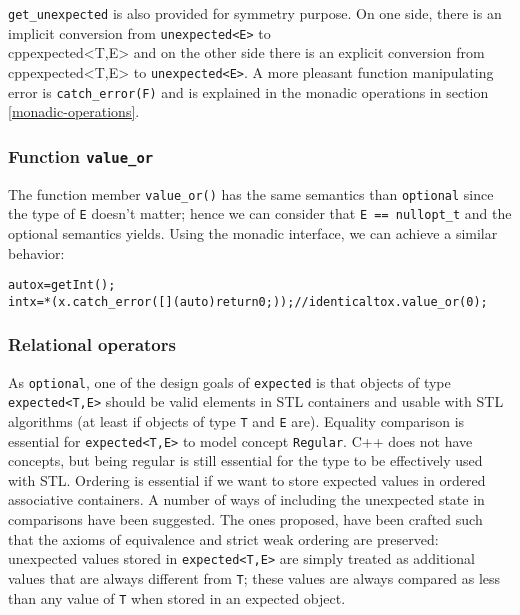 \documentclass[a4paper,10pt]{article}
\newcommand{\cpp}[1]{\lstinline{#1}}
\begin{document}
\cpp{get_unexpected} is also provided for symmetry purpose. On one side, there is an implicit conversion from \cpp{unexpected<E>} to \\cpp{expected<T,E>} and on the other side there is an explicit conversion from \\cpp{expected<T,E>} to \cpp{unexpected<E>}. A more pleasant function manipulating error is \cpp{catch_error(F)} and is explained in the monadic operations in section \ref{monadic-operations}.

\subsubsection{Function \cpp{value_or}}

The function member \cpp{value_or()} has the same semantics than \cpp{optional}\cite{OptionalRev4} since the type of \cpp{E} doesn't matter; hence we can consider that \cpp{E == nullopt_t} and the optional semantics yields. Using the monadic interface, we can achieve a similar behavior:

\begin{alltt}
auto x = getInt();
int x = *(x.catch_error([](auto){return 0;})); // identical to x.value_or(0);
\end{alltt}

\subsubsection{Relational operators}

As \cpp{optional}, one of the design goals of \cpp{expected} is that objects of type \cpp{expected<T,E>} should be valid elements in STL containers and usable with STL algorithms (at least if objects of type \cpp{T} and \cpp{E} are). Equality comparison is essential for \cpp{expected<T,E>} to model concept \cpp{Regular}. C++ does not have concepts, but being regular is still essential for the type to be effectively used with STL. Ordering is essential if we want to store expected values in ordered associative containers. A number of ways of including the unexpected state in comparisons have been suggested. The ones proposed, have been crafted such that the axioms of equivalence and strict weak ordering are preserved: unexpected values stored in \cpp{expected<T,E>} are simply treated as additional values that are always different from \cpp{T}; these values are always compared as less than any value of \cpp{T} when stored in an expected object. 
\end{document}
